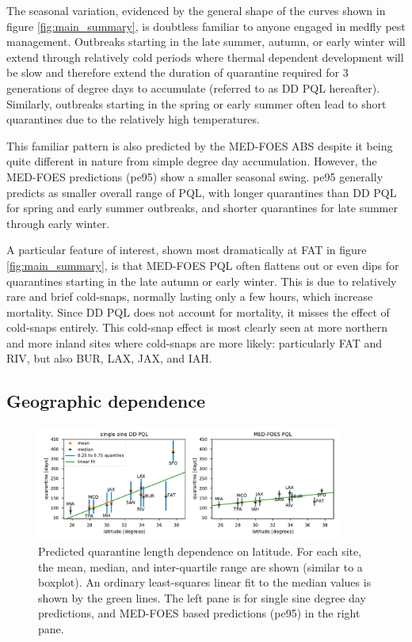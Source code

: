 \documentclass[10pt,a4paper,twocolumn]{article}
\begin{document}
The seasonal variation, evidenced by the general shape of the curves shown in figure \ref{fig:main_summary}, 
is doubtless familiar to anyone engaged in medfly pest management.
Outbreaks starting in the late summer, autumn, or early winter will extend through relatively cold periods
where thermal dependent development will be slow and therefore extend the duration of quarantine required
for 3 generations of degree days to accumulate (referred to as DD PQL hereafter).
Similarly, outbreaks starting in the spring or early summer often lead to short quarantines due
to the relatively high temperatures.

This familiar pattern is also predicted by the MED-FOES ABS despite it being quite different in nature
from simple degree day accumulation.
However, the MED-FOES predictions (pe95) show a smaller seasonal swing.
pe95 generally predicts as smaller overall range of PQL,
with longer quarantines than DD PQL for spring and early summer outbreaks,
and shorter quarantines for late summer through early winter.

A particular feature of interest, shown most dramatically at FAT in figure \ref{fig:main_summary},
is that MED-FOES PQL often flattens out or even dips for quarantines starting in the late 
autumn or early winter.  This is due to relatively rare and brief cold-snaps,
normally lasting only a few hours, which increase mortality.
Since DD PQL does not account for mortality, it misses the effect of cold-snaps entirely.
This cold-snap effect is most clearly seen at more northern and 
more inland sites where cold-snaps are more likely: 
particularly FAT and RIV, but also BUR, LAX, JAX, and IAH.

\subsection*{Geographic dependence}

\begin{figure}[ht!]
\centering
\includegraphics[width=0.9\textwidth]{figs/fig_latitude_trend_withSFO.pdf}
\caption{\label{fig:latitude_trend} Predicted quarantine length dependence on latitude.
For each site, the mean, median, and inter-quartile range are shown (similar to a boxplot).
An ordinary least-squares linear fit to the median values is shown by the green lines.
The left pane is for single sine degree day predictions,
and MED-FOES based predictions (pe95) in the right pane.
}
\end{figure}
\end{document}
